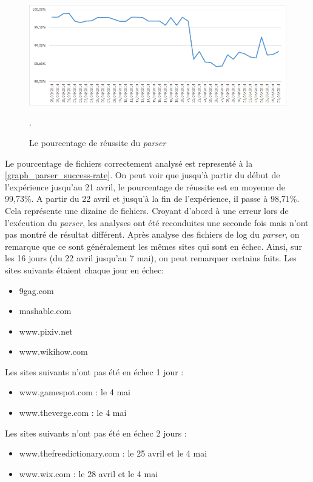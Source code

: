 \begin{figure}[h]
	\centering
	\includegraphics[scale=.8]{graphiques/graph_parser_success-rate.png}
	\caption{\label{graph_parser_success-rate}Le pourcentage de réussite du \textit{parser}}.
\end{figure}

Le pourcentage de fichiers correctement analysé est representé à la \autoref{graph_parser_success-rate}. On peut voir que jusqu'à partir du début de l'expérience jusqu'au 21 avril, le pourcentage de réussite est en moyenne de 99,73\%. A partir du 22 avril et jusqu'à la fin de l'expérience, il passe à 98,71\%. Cela représente une dizaine de fichiers.
Croyant d'abord à une erreur lors de l'exécution du \textit{parser}, les analyses ont été reconduites une seconde fois mais n'ont pas montré de résultat différent.
Après analyse des fichiers de log du \textit{parser}, on remarque que ce sont généralement les mêmes sites qui sont en échec.
Ainsi, sur les 16 jours (du 22 avril jusqu'au 7 mai), on peut remarquer certains faits.
\newline
Les sites suivants étaient chaque jour en échec:
\begin{itemize}
  \item 9gag.com
  \item mashable.com
  \item www.pixiv.net
  \item www.wikihow.com
  \newline
\end{itemize}
Les sites suivants n'ont pas été en échec 1 jour :
\begin{itemize}
  \item www.gamespot.com : le 4 mai
  \item www.theverge.com : le 4 mai
\end{itemize}
Les sites suivants n'ont pas été en échec 2 jours :
\begin{itemize}
  \item www.thefreedictionary.com : le 25 avril et le 4 mai
  \item www.wix.com : le 28 avril et le 4 mai
  \newline
\end{itemize}
